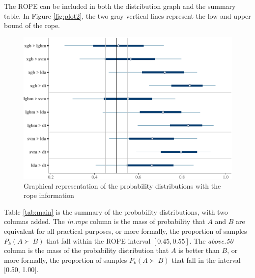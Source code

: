 \documentclass[twoside,11pt,preprint]{article}
\begin{document}
The ROPE can be included in both the distribution graph and the
summary table. In Figure \ref{fig:plot2}, the two gray vertical lines
represent the low and upper bound of the rope.

\begin{figure}
\includegraphics[width=0.7\linewidth]{figure_latex/xplot2-1} \caption{\label{fig:plot2}Graphical representation of the probability distributions with the rope information}\label{fig:xplot2}
\end{figure}

Table \ref{tab:main} is the summary of the probability distributions,
with two columns added. The {\em in.rope} column is the mass of
probability that \(A\) and \(B\) are equivalent for all practical
purposes, or more formally, the proportion of samples \(P_k(A \succ\,B)\) that fall within the ROPE interval \([0.45,0.55]\). The {\em above.50}
column is the mass of the probability distribution that \(A\) is better
than \(B\), or more formally, the proportion of samples \(P_k(A \succ\,B)\) that fall in the interval {[}0.50, 1.00{]}.
\end{document}

